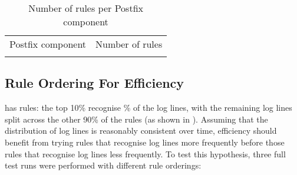 



\begin{table}[thbp]
    \caption{Number of rules per Postfix component}
    \empty{}\label{Number of rules per Postfix component}
    \centering{}
    \begin{tabular}{lr}
        \tabletopline{}%
        Postfix component & Number of rules \\
        \tablemiddleline{}%
        
        \tablebottomline{}%
    \end{tabular}
\end{table}

\FloatBarrier{}

\subsection{Rule Ordering For Efficiency}

\label{rule ordering for efficiency}

\parsername{} has \numberOFrules{} rules: the top 10\% recognise
\% of the log lines, with the remaining
log lines split across the other 90\% of the rules (as shown in
).  Assuming that the distribution of log lines
is reasonably consistent over time, \parsernames{} efficiency should
benefit from trying rules that recognise log lines more frequently before
those rules that recognise log lines less frequently.  To test this
hypothesis, three full test runs were performed with different rule
orderings:

